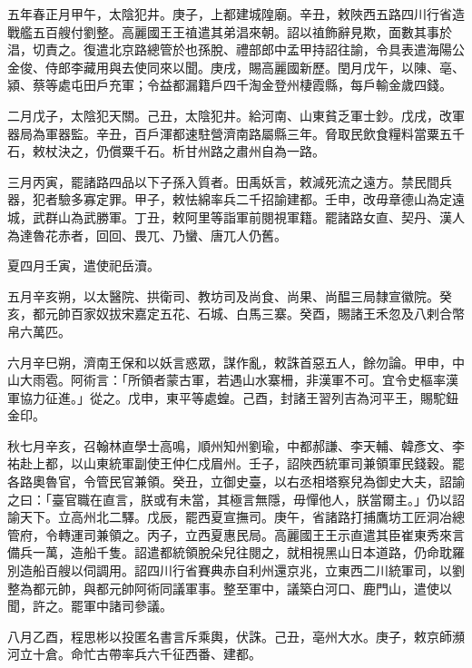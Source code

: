 \begin{pinyinscope}



 五年春正月甲午，太陰犯井。庚子，上都建城隍廟。辛丑，敕陜西五路四川行省造戰艦五百艘付劉整。高麗國王王禃遣其弟淐來朝。詔以禃飾辭見欺，面數其事於淐，切責之。復遣北京路總管於也孫脫、禮部郎中孟甲持詔往諭，令具表遣海陽公金俊、侍郎李藏用與去使同來以聞。庚戌，賜高麗國新歷。閏月戊午，以陳、亳、潁、蔡等處屯田戶充軍；令益都漏籍戶四千淘金登州棲霞縣，每戶輸金歲四錢。



 二月戊子，太陰犯天關。己丑，太陰犯井。給河南、山東貧乏軍士鈔。戊戌，改軍器局為軍器監。辛丑，百戶渾都速駐營濟南路屬縣三年。脅取民飲食糧料當粟五千石，敕杖決之，仍償粟千石。析甘州路之肅州自為一路。



 三月丙寅，罷諸路四品以下子孫入質者。田禹妖言，敕減死流之遠方。禁民間兵器，犯者驗多寡定罪。甲子，敕怯綿率兵二千招諭建都。壬申，改毋章德山為定遠城，武群山為武勝軍。丁丑，敕阿里等詣軍前閱視軍籍。罷諸路女直、契丹、漢人為達魯花赤者，回回、畏兀、乃蠻、唐兀人仍舊。



 夏四月壬寅，遣使祀岳瀆。



 五月辛亥朔，以太醫院、拱衛司、教坊司及尚食、尚果、尚醖三局隸宣徽院。癸亥，都元帥百家奴拔宋嘉定五花、石城、白馬三寨。癸酉，賜諸王禾忽及八剌合幣帛六萬匹。



 六月辛巳朔，濟南王保和以妖言惑眾，謀作亂，敕誅首惡五人，餘勿論。甲申，中山大雨雹。阿術言：「所領者蒙古軍，若遇山水寨柵，非漢軍不可。宜令史樞率漢軍協力征進。」從之。戊申，東平等處蝗。己酉，封諸王習列吉為河平王，賜駝鈕金印。



 秋七月辛亥，召翰林直學士高鳴，順州知州劉瑜，中都郝謙、李天輔、韓彥文、李祐赴上都，以山東統軍副使王仲仁戍眉州。壬子，詔陜西統軍司兼領軍民錢穀。罷各路奧魯官，令管民官兼領。癸丑，立御史臺，以右丞相塔察兒為御史大夫，詔諭之曰：「臺官職在直言，朕或有未當，其極言無隱，毋憚他人，朕當爾主。」仍以詔諭天下。立高州北二驛。戊辰，罷西夏宣撫司。庚午，省諸路打捕鷹坊工匠洞冶總管府，令轉運司兼領之。丙子，立西夏惠民局。高麗國王王示直遣其臣崔東秀來言備兵一萬，造船千隻。詔遣都統領脫朵兒往閱之，就相視黑山日本道路，仍命耽羅別造船百艘以伺調用。詔四川行省賽典赤自利州還京兆，立東西二川統軍司，以劉整為都元帥，與都元帥阿術同議軍事。整至軍中，議築白河口、鹿門山，遣使以聞，許之。罷軍中諸司參議。



 八月乙酉，程思彬以投匿名書言斥乘輿，伏誅。己丑，亳州大水。庚子，敕京師瀕河立十倉。命忙古帶率兵六千征西番、建都。




\end{pinyinscope}
